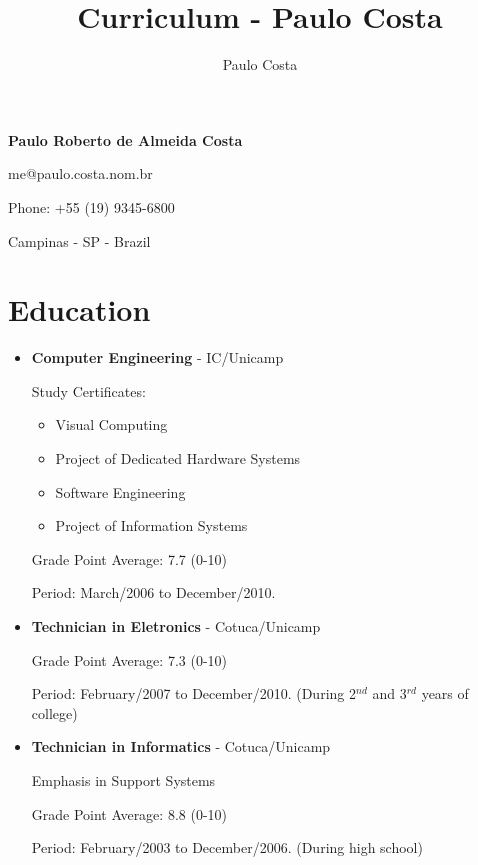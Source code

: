 \documentclass[a4paper,10pt]{article}
\title{Curriculum - Paulo Costa}
\author{Paulo Costa}
\begin{document}
  
  \LARGE\textbf{Paulo Roberto de Almeida Costa}

  \large me@paulo.costa.nom.br

  \large Phone: +55 (19) 9345-6800

  \large Campinas - SP - Brazil

  \normalsize 
  \section{Education}
    \begin{itemize}
      \item  
        \textbf{Computer Engineering} - IC/Unicamp

        Study Certificates:
        \begin{itemize}
          \item Visual Computing
          \item Project of Dedicated Hardware Systems
          \item Software Engineering
          \item Project of Information Systems
        \end{itemize}

        Grade Point Average: 7.7  (0-10)

        Period: March/2006 to December/2010.

% 

      \item  
        \textbf{Technician in Eletronics} - Cotuca/Unicamp

        Grade Point Average: 7.3  (0-10)

        Period: February/2007 to December/2010. {\small(During 2$^{nd}$ and 3$^{rd}$ years of college)}

      \item  
        \textbf{Technician in Informatics} - Cotuca/Unicamp

        Emphasis in Support Systems

        Grade Point Average: 8.8  (0-10)

        Period: February/2003 to December/2006. {\small(During high school)}

    \end{itemize}
\end{document}
